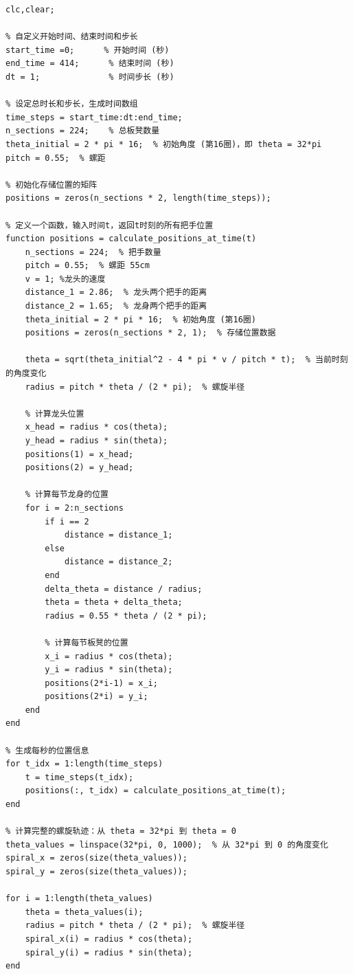 \documentclass{cumcmthesis1}
\begin{document}
\begin{lstlisting}[caption={问题2中对板凳龙运动及碰撞进行模拟的代码}, label={lst:third_code}]
clc,clear;

% 自定义开始时间、结束时间和步长
start_time =0;      % 开始时间 (秒)
end_time = 414;      % 结束时间 (秒)
dt = 1;              % 时间步长 (秒)

% 设定总时长和步长，生成时间数组
time_steps = start_time:dt:end_time;
n_sections = 224;    % 总板凳数量
theta_initial = 2 * pi * 16;  % 初始角度 (第16圈)，即 theta = 32*pi
pitch = 0.55;  % 螺距

% 初始化存储位置的矩阵
positions = zeros(n_sections * 2, length(time_steps));

% 定义一个函数，输入时间t，返回t时刻的所有把手位置
function positions = calculate_positions_at_time(t)
    n_sections = 224;  % 把手数量
    pitch = 0.55;  % 螺距 55cm
    v = 1; %龙头的速度
    distance_1 = 2.86;  % 龙头两个把手的距离
    distance_2 = 1.65;  % 龙身两个把手的距离
    theta_initial = 2 * pi * 16;  % 初始角度 (第16圈)
    positions = zeros(n_sections * 2, 1);  % 存储位置数据
    
    theta = sqrt(theta_initial^2 - 4 * pi * v / pitch * t);  % 当前时刻的角度变化
    radius = pitch * theta / (2 * pi);  % 螺旋半径
    
    % 计算龙头位置
    x_head = radius * cos(theta); 
    y_head = radius * sin(theta);
    positions(1) = x_head;
    positions(2) = y_head;
    
    % 计算每节龙身的位置
    for i = 2:n_sections
        if i == 2
            distance = distance_1;
        else
            distance = distance_2;
        end
        delta_theta = distance / radius;
        theta = theta + delta_theta;
        radius = 0.55 * theta / (2 * pi);
        
        % 计算每节板凳的位置
        x_i = radius * cos(theta);
        y_i = radius * sin(theta);
        positions(2*i-1) = x_i;
        positions(2*i) = y_i;
    end
end

% 生成每秒的位置信息
for t_idx = 1:length(time_steps)
    t = time_steps(t_idx);
    positions(:, t_idx) = calculate_positions_at_time(t);
end

% 计算完整的螺旋轨迹：从 theta = 32*pi 到 theta = 0
theta_values = linspace(32*pi, 0, 1000);  % 从 32*pi 到 0 的角度变化
spiral_x = zeros(size(theta_values));
spiral_y = zeros(size(theta_values));

for i = 1:length(theta_values)
    theta = theta_values(i);
    radius = pitch * theta / (2 * pi);  % 螺旋半径
    spiral_x(i) = radius * cos(theta);
    spiral_y(i) = radius * sin(theta);
end


\end{lstlisting}
\end{document}

